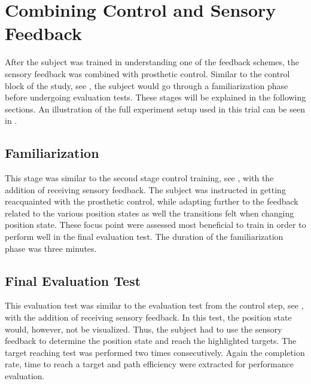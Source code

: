 \section{Combining Control and Sensory Feedback}
After the subject was trained in understanding one of the feedback schemes, the sensory feedback was combined with prosthetic control. Similar to the control block of the study, see , the subject would go through a familiarization phase before undergoing evaluation tests.  These stages will be explained in the following sections. An illustration of the full experiment setup used in this trial can be seen in .

\subsection{Familiarization}
This stage was similar to the second stage control training, see , with the addition of receiving sensory feedback. The subject was instructed in getting reacquainted with the prosthetic control, while adapting further to the feedback related to the various position states as well the transitions felt when changing position state. These focus point were assessed most beneficial to train in order to perform well in the final evaluation test. The duration of the familiarization phase was three minutes.

\subsection{Final Evaluation Test}
This evaluation test was similar to the evaluation test from the control step, see , with the addition of receiving sensory feedback. In this test, the position state would, however, not be visualized. Thus, the subject had to use the sensory feedback to determine the position state and reach the highlighted targets. The target reaching test was performed two times consecutively. Again the completion rate, time to reach a target and path efficiency were extracted for performance evaluation.

